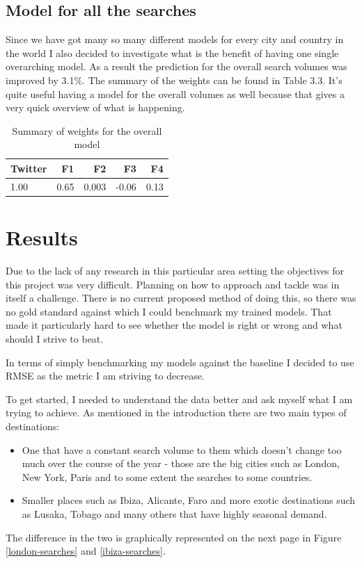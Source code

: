 \documentclass[minf,twoside,singlespacing,parskip,frontabs]{infthesis}
\begin{document}
\newpage
\section{Model for all the searches}

Since we have got many so many different models for every city and country in the world I also decided to investigate what is the benefit of having one single overarching model. As a result the prediction for the overall search volumes was improved by 3.1\%. The summary of the weights can be found in Table 3.3. It's quite useful having a model for the overall volumes as well because that gives a very quick overview of what is happening. 

\begin{table}[h]
\begin{center}
\begin{tabular}{ l | r | r | r | r }
Twitter & F1 & F2 & F3 & F4 \\
\hline
1.00 & 0.65 & 0.003 & -0.06 & 0.13 \\
\end{tabular}
\end{center}
\caption{Summary of weights for the overall model}
\end{table}



\chapter{Results}
\label{chap:results}


Due to the lack of any research in this particular area setting the objectives for this project was very difficult. Planning on how to approach and tackle was in itself a challenge. There is no current proposed method of doing this, so there was no gold standard against which I could benchmark my trained models. That made it particularly hard to see whether the model is right or wrong and what should I strive to beat. 

In terms of simply benchmarking my models against the baseline I decided to use RMSE as the metric I am striving to decrease.


To get started, I needed to understand the data better and ask myself what I am trying to achieve. As mentioned in the introduction there are two main types of destinations:

\begin{itemize}
\item One that have a constant search volume to them which doesn't change too much over the course of the year - those are the big cities such as London, New York, Paris and to some extent the searches to some countries. 
\item Smaller places such as Ibiza, Alicante, Faro and more exotic destinations such as Lusaka, Tobago and many others that have highly seasonal demand.
\end{itemize}
The difference in the two is graphically represented on the next page in Figure \ref{london-searches} and \ref{ibiza-searches}. 
\end{document}
